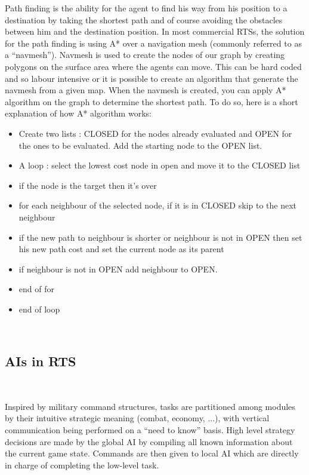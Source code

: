 \documentclass[a4paper,10pt]{book}
\newcommand{\quotes}[1]{``#1''}
\newcommand\tab[1][1cm]{\hspace*{#1}}
\begin{document}
Path finding is the ability for the agent to find his way from his position to a destination by taking the shortest path and of course avoiding the obstacles between him and the destination position.
In most commercial RTSs, the solution for the path finding is using A* over a navigation mesh (commonly referred to as a \quotes{navmesh}). Navmesh is used to create the nodes of our graph by creating polygons	on the surface area where the agents can move. This can be hard coded and so labour intensive or it is possible to create an algorithm that generate the navmesh from a given map.
When the navmesh is created, you can apply A* algorithm on the graph to determine the shortest path.
To do so, here is a short explanation of how A* algorithm works:
\begin{itemize}
 \item Create two lists : CLOSED for the nodes already evaluated and OPEN for the ones to be evaluated. Add the starting node to the OPEN list.
 \item A loop : select the lowest cost node in open and move it to the CLOSED list
 \item \tab if the node is the target then it's over
 \item \tab for each neighbour of the selected node, if it is in CLOSED skip to the next neighbour
 \item \tab \tab if the new path to neighbour is shorter or neighbour is not in OPEN then set his new path cost and set the current node as its parent
 \item \tab \tab if neighbour is not in OPEN add neighbour to OPEN.
 \item	\tab end of for
 \item end of loop
\end{itemize}
             
~

\subsection{AIs in RTS}

~

Inspired by  military command structures,  tasks are partitioned among modules
by their intuitive strategic meaning (combat, economy, ...),
with vertical communication being performed on a “need to
know” basis.  High level strategy decisions are made by the
global AI by compiling all known information about
the current game state.  Commands are then given to local AI
which are directly in charge of completing the low-level task.
\end{document}
